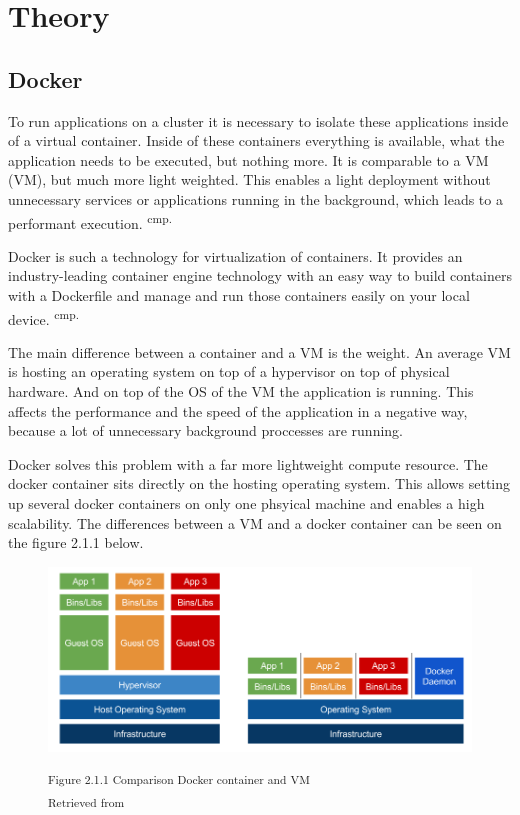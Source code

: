 \chapter{Theory}

\section{Docker} 

To run applications on a cluster it is necessary to isolate these applications inside of a virtual container. Inside of these containers everything is available, what the application needs to be executed, but nothing more. It is comparable to a \acs{VM} (\acl{VM}), but much more light weighted. This enables a light deployment without unnecessary services or applications running in the background, which leads to a performant execution. \textsuperscript{cmp.\cite{11}}


Docker is such a technology for virtualization of containers. It provides an industry-leading container engine technology with an easy way to build containers with a Dockerfile and manage and run those containers easily on your local device. \textsuperscript{cmp.\cite{12}}


The main difference between a container and a VM is the weight. An average VM is hosting an operating system on top of a hypervisor on top of physical hardware. And on top of the OS of the VM the application is running. This affects the performance and the speed of the application in a negative way, because a lot of unnecessary background proccesses are running. 

Docker solves this problem with a far more lightweight compute resource. The docker container sits directly on the hosting operating system. This allows setting up several docker containers on only one phsyical machine and enables a high scalability. The differences between a VM and a docker container can be seen on the figure 2.1.1 below.

\begin{figure}[h]
\centering
\includegraphics[width=\textwidth/5*4]{images/docker_vm_differences.png}

\textsuperscript{Figure 2.1.1 Comparison Docker container and VM}\\
\textsuperscript{Retrieved from \cite{13}}
\end{figure}


